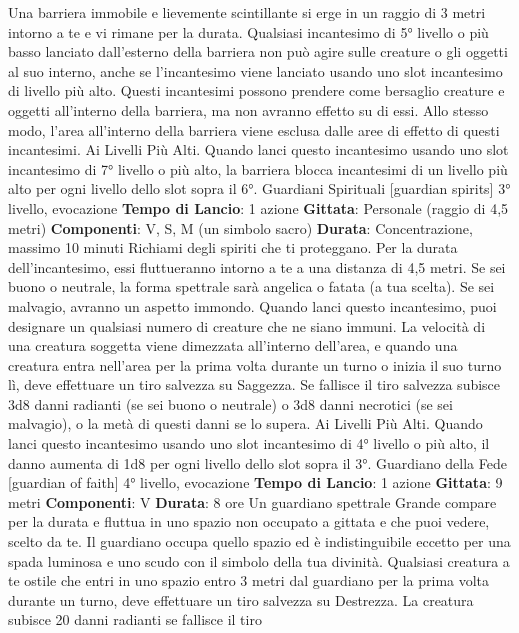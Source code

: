 \begin{multicols}{2}
Una barriera immobile e lievemente scintillante si erge
in un raggio di 3 metri intorno a te e vi rimane per la
durata.
Qualsiasi incantesimo di 5° livello o più basso lanciato
dall’esterno della barriera non può agire sulle creature o
gli oggetti al suo interno, anche se l’incantesimo viene
lanciato usando uno slot incantesimo di livello più alto.
Questi incantesimi possono prendere come bersaglio
creature e oggetti all’interno della barriera, ma non
avranno effetto su di essi. Allo stesso modo, l’area
all’interno della barriera viene esclusa dalle aree di
effetto di questi incantesimi.
Ai Livelli Più Alti. Quando lanci questo incantesimo
usando uno slot incantesimo di 7° livello o più alto, la
barriera blocca incantesimi di un livello più alto per ogni
livello dello slot sopra il 6°.
Guardiani Spirituali
[guardian spirits]
3° livello, evocazione
\textbf{Tempo di Lancio}: 1 azione
\textbf{Gittata}: Personale (raggio di 4,5 metri)
\textbf{Componenti}: V, S, M (un simbolo sacro)
\textbf{Durata}: Concentrazione, massimo 10 minuti
Richiami degli spiriti che ti proteggano. Per la durata
dell’incantesimo, essi fluttueranno intorno a te a una
distanza di 4,5 metri. Se sei buono o neutrale, la forma
spettrale sarà angelica o fatata (a tua scelta). Se sei
malvagio, avranno un aspetto immondo.
Quando lanci questo incantesimo, puoi designare un
qualsiasi numero di creature che ne siano immuni. La
velocità di una creatura soggetta viene dimezzata
all’interno dell’area, e quando una creatura entra
nell’area per la prima volta durante un turno o inizia il
suo turno lì, deve effettuare un tiro salvezza su
Saggezza. Se fallisce il tiro salvezza subisce 3d8 danni
radianti (se sei buono o neutrale) o 3d8 danni necrotici
(se sei malvagio), o la metà di questi danni se lo
supera.
Ai Livelli Più Alti. Quando lanci questo incantesimo
usando uno slot incantesimo di 4° livello o più alto, il
danno aumenta di 1d8 per ogni livello dello slot sopra il
3°.
Guardiano della Fede
[guardian of faith]
4° livello, evocazione
\textbf{Tempo di Lancio}: 1 azione
\textbf{Gittata}: 9 metri
\textbf{Componenti}: V
\textbf{Durata}: 8 ore
Un guardiano spettrale Grande compare per la durata e
fluttua in uno spazio non occupato a gittata e che puoi
vedere, scelto da te. Il guardiano occupa quello spazio
ed è indistinguibile eccetto per una spada luminosa e
uno scudo con il simbolo della tua divinità.
Qualsiasi creatura a te ostile che entri in uno spazio
entro 3 metri dal guardiano per la prima volta durante
un turno, deve effettuare un tiro salvezza su Destrezza.
La creatura subisce 20 danni radianti se fallisce il tiro

\end{multicols}
